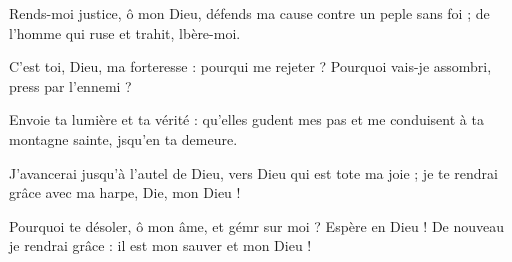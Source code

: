 \item Rends-moi justice, ô mon Dieu, défends ma cause contre un peple sans foi ;\psstar{} de l’homme qui ruse et trahit, lbère-moi.
\item C’est toi, Dieu, ma forteresse : pourqui me rejeter ?\psstar{} Pourquoi vais-je assombri, press par l’ennemi ?
\item Envoie ta lumière et ta vérité : qu’elles gudent mes pas\psstar{} et me conduisent à ta montagne sainte, jsqu’en ta demeure.
\item J’avancerai jusqu’à l’autel de Dieu, vers Dieu qui est tote ma joie ;\psstar{} je te rendrai grâce avec ma harpe, Die, mon Dieu !
\item Pourquoi te désoler, ô mon âme, et gémr sur moi ?\psstar{} Espère en Dieu ! De nouveau je rendrai grâce : il est mon sauver et mon Dieu !